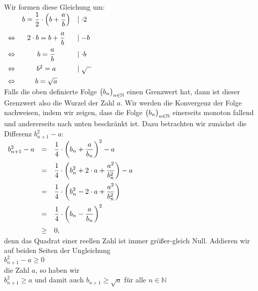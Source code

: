 Wir formen diese Gleichung um:
\\[0.2cm]
\hspace*{1.3cm}
$
\begin{array}{lcll}
                & \displaystyle b     = \frac{1}{2}\cdot  \left(b + \frac{a}{b}\right) & \mid \cdot  2 \\[0.4cm]
\Leftrightarrow & \displaystyle 2 \cdot  b = b + \frac{a}{b}                           & \mid - b  \\[0.3cm]
\Leftrightarrow & \displaystyle b = \frac{a}{b}                                   & \mid \cdot  b  \\[0.3cm]
\Leftrightarrow & b^2 = a                                            & \mid \sqrt{\;\;}  \\[0.2cm]
\Leftrightarrow & b  = \sqrt{a}                                      & 
\end{array}
$
\\[0.2cm]
Falls die oben definierte Folge $\bigl(b_n\bigr)_{n\in\mathbb{N}}$ einen Grenzwert hat, dann ist dieser
Grenzwert also die Wurzel der Zahl $a$.  Wir werden die Konvergenz der Folge nachweisen,
indem wir zeigen, dass die Folge $\bigl(b_n\bigr)_{n\in\mathbb{N}}$ einerseits monoton fallend und andererseits 
nach unten beschr\"ankt ist.  Dazu betrachten wir zun\"achst die Differenz $b_{n+1}^2 - a$:
\\[0.2cm]
\hspace*{1.3cm}
$
\begin{array}{lcl}
  b_{n+1}^2 - a & =    & \displaystyle\frac{1}{4} \cdot  \left(b_n + \frac{a}{b_n}\right)^2 - a \\[0.4cm]
                & =    & \displaystyle\frac{1}{4} \cdot  \left(b_n^2 + 2\cdot a + \frac{a^2}{b_n^2}\right) - a \\[0.4cm]
                & =    & \displaystyle\frac{1}{4} \cdot  \left(b_n^2 - 2\cdot a + \frac{a^2}{b_n^2}\right) \\[0.4cm]
                & =    & \displaystyle\frac{1}{4} \cdot  \left(b_n - \frac{a}{b_n}\right)^2 \\[0.4cm]
                & \geq & 0, 
\end{array}
$
\\[0.2cm]
denn das Quadrat einer reellen Zahl ist immer gr\"o\ss{}er-gleich Null.
Addieren wir auf beiden Seiten der Ungleichung
\\[0.2cm]
\hspace*{1.3cm}
$b_{n+1}^2 - a \geq 0$
\\[0.2cm]
die Zahl  $a$, so haben wir
\\[0.2cm]
\hspace*{1.3cm}
 $b_{n+1}^2 \geq a$ \quad und damit auch \quad $b_{n+1} \geq \sqrt{a}$ \quad f\"ur alle $n \in \mathbb{N}$
